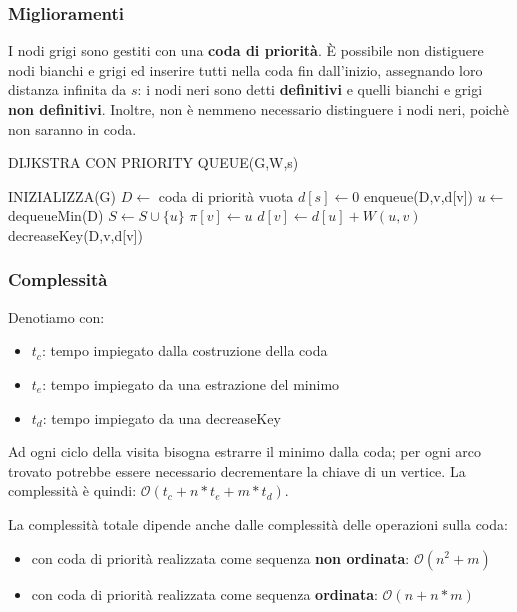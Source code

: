 \documentclass[11pt]{article}
\begin{document}
\subsubsection{Miglioramenti}
I nodi grigi sono gestiti con una \textbf{coda di priorità}. È possibile non distiguere nodi bianchi e grigi ed inserire 
tutti nella coda fin dall'inizio, assegnando loro distanza infinita da $s$: i nodi neri sono detti \textbf{definitivi} e 
quelli bianchi e grigi \textbf{non definitivi}. Inoltre, non è nemmeno necessario distinguere i nodi neri, poichè non saranno 
in coda.
\begin{algorithm}[H]
    \caption{DIJKSTRA CON PRIORITY QUEUE(G,W,s)}
    \begin{algorithmic}
        \State INIZIALIZZA(G)
        \State $D\gets$ coda di priorità vuota
        \State $d[s]\gets 0$
            \State enqueue(D,v,d[v])
        \EndFor
            \State $u\gets$ dequeueMin(D)
            \State $S\gets S\cup\{u\}$
                    \State $\pi[v]\gets u$
                    \State $d[v]\gets d[u]+W(u,v)$
                    \State decreaseKey(D,v,d[v])
                \EndIf
            \EndFor
        \EndWhile
    \end{algorithmic}
\end{algorithm}
\subsubsection{Complessità}
Denotiamo con:
\begin{itemize}
    \item $t_c$: tempo impiegato dalla costruzione della coda 
    \item $t_e$: tempo impiegato da una estrazione del minimo 
    \item $t_d$: tempo impiegato da una decreaseKey
\end{itemize}
Ad ogni ciclo della visita bisogna estrarre il minimo dalla coda; per ogni arco trovato potrebbe essere necessario decrementare 
la chiave di un vertice. La complessità è quindi: $\mathcal{O}(t_c+n*t_e+m*t_d)$.

La complessità totale dipende anche dalle complessità delle operazioni sulla coda:
\begin{itemize}
    \item con coda di priorità realizzata come sequenza \textbf{non ordinata}: $\mathcal{O}(n^2+m)$
    \item con coda di priorità realizzata come sequenza \textbf{ordinata}: $\mathcal{O}(n+n*m)$
\end{itemize}
\end{document}
